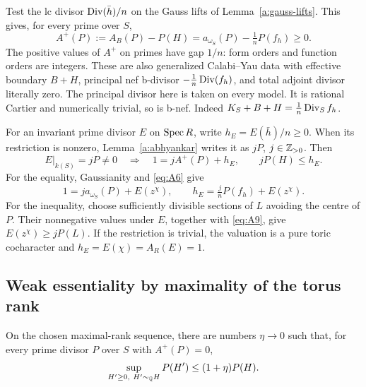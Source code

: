 Test the lc divisor \(\operatorname{Div}(\bar h)/n\) on the Gauss lifts of
Lemma~\ref{a:gauss-lifts}. This gives, for every prime over \(S\),
\begin{equation}
 A^+(P):=A_B(P)-P(H)
       =a_{\omega_S}(P)-\tfrac1n P(f_h)\geq0.
 \label{eq:A10}
\end{equation}
The positive values of \(A^+\) on primes have gap \(1/n\): form orders
and function orders are integers. These are also generalized Calabi--Yau
data with effective boundary \(B+H\), principal nef b-divisor
\(-\frac1n\operatorname{Div}(f_h)\), and total adjoint divisor literally zero. The
principal divisor here is taken on every model. It is rational Cartier
and numerically trivial, so is b-nef. Indeed
\(K_S+B+H=\frac1n\operatorname{Div}_S f_h\).

For an invariant prime divisor \(E\) on \(\operatorname{Spec} R\), write
\(h_E=E(\bar h)/n\geq0\). When its restriction is nonzero,
Lemma~\ref{a:abhyankar} writes it as \(jP\), \(j\in\mathbb Z_{>0}\).
Then
\begin{equation}
 E|_{k(S)}=jP\ne0
       \quad\Longrightarrow\quad
       1=jA^+(P)+h_E,\qquad jP(H)\leq h_E.
 \label{eq:A11}
\end{equation}
For the equality, Gaussianity and \eqref{eq:A6} give
\[
 1=j a_{\omega_S}(P)+E(z^\chi),\qquad
 h_E=\tfrac jnP(f_h)+E(z^\chi).
\]
For the inequality, choose sufficiently divisible sections of \(L\)
avoiding the centre of \(P\). Their nonnegative values under \(E\),
together with \eqref{eq:A9}, give \(E(z^\chi)\geq jP(L)\).
If the restriction is trivial, the valuation is a pure toric
cocharacter and \(h_E=E(\chi)=A_R(E)=1\).

\subsection{Weak essentiality by maximality of the torus rank}

\begin{proposition}\label{a:weak-essentiality}
On the chosen maximal-rank sequence, there are numbers \(\eta\to0\)
such that, for every prime divisor \(P\) over \(S\) with \(A^+(P)=0\),
\begin{equation}
       \sup_{H'\geq0,\ H'\sim_{\mathbb Q}H} P(H')
                            \leq(1+\eta)P(H).
 \label{eq:A12}
\end{equation}
\end{proposition}

